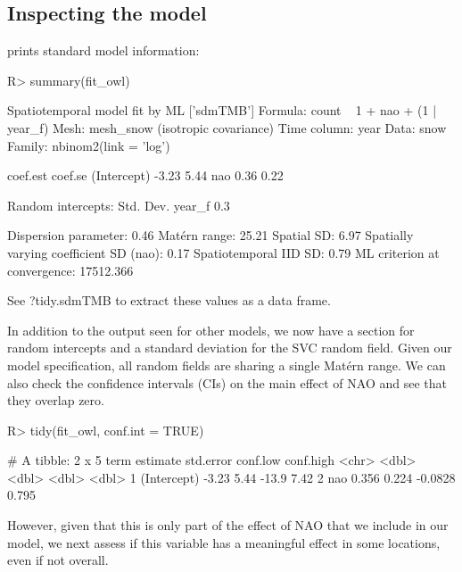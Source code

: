 \documentclass[article]{jss}\usepackage[]{graphicx}\usepackage[dvipsnames]{xcolor}
\newcommand{\fct}[1]{\code{#1()}}
\begin{document}
\subsection{Inspecting the model}

\fct{summary} prints standard model information:



\begin{Schunk}
\begin{Sinput}
R> summary(fit_owl)
\end{Sinput}
\begin{Soutput}
Spatiotemporal model fit by ML ['sdmTMB']
Formula: count ~ 1 + nao + (1 | year_f)
Mesh: mesh_snow (isotropic covariance)
Time column: year
Data: snow
Family: nbinom2(link = 'log')
 
            coef.est coef.se
(Intercept)    -3.23    5.44
nao             0.36    0.22

Random intercepts:
       Std. Dev.
year_f       0.3

Dispersion parameter: 0.46
Matérn range: 25.21
Spatial SD: 6.97
Spatially varying coefficient SD (nao): 0.17
Spatiotemporal IID SD: 0.79
ML criterion at convergence: 17512.366

See ?tidy.sdmTMB to extract these values as a data frame.
\end{Soutput}
\end{Schunk}

In addition to the output seen for other models, we now have a section for random intercepts and a standard deviation for the SVC random field.
Given our model specification, all random fields are sharing a single Matérn range.
We can also check the confidence intervals (CIs) on the main effect of NAO and see that they overlap zero.

\begin{Schunk}
\begin{Sinput}
R> tidy(fit_owl, conf.int = TRUE)
\end{Sinput}
\begin{Soutput}
# A tibble: 2 x 5
  term        estimate std.error conf.low conf.high
  <chr>          <dbl>     <dbl>    <dbl>     <dbl>
1 (Intercept)   -3.23      5.44  -13.9        7.42 
2 nao            0.356     0.224  -0.0828     0.795
\end{Soutput}
\end{Schunk}

However, given that this is only part of the effect of NAO that we include in our model, we next assess if this variable has a meaningful effect in some locations, even if not overall.
\end{document}
